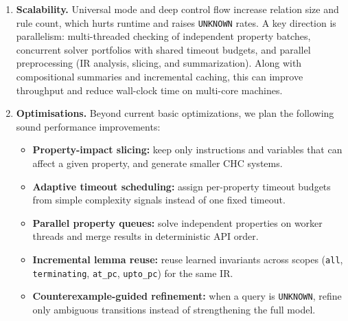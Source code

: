 \begin{enumerate}
    \item \textbf{Scalability.} Universal mode and deep control flow increase relation size and rule count, which hurts runtime and raises \texttt{UNKNOWN} rates. A key direction is parallelism: multi-threaded checking of independent property batches, concurrent solver portfolios with shared timeout budgets, and parallel preprocessing (IR analysis, slicing, and summarization). Along with compositional summaries and incremental caching, this can improve throughput and reduce wall-clock time on multi-core machines.
    
    \item \textbf{Optimisations.} Beyond current basic optimizations, we plan the following sound performance improvements:
    \begin{itemize}
        \item \textbf{Property-impact slicing:} keep only instructions and variables that can affect a given property, and generate smaller CHC systems.
        \item \textbf{Adaptive timeout scheduling:} assign per-property timeout budgets from simple complexity signals instead of one fixed timeout.
        \item \textbf{Parallel property queues:} solve independent properties on worker threads and merge results in deterministic API order.
        \item \textbf{Incremental lemma reuse:} reuse learned invariants across scopes (\texttt{all}, \texttt{terminating}, \texttt{at\_pc}, \texttt{upto\_pc}) for the same IR.
        \item \textbf{Counterexample-guided refinement:} when a query is \texttt{UNKNOWN}, refine only ambiguous transitions instead of strengthening the full model.
    \end{itemize}
\end{enumerate}
